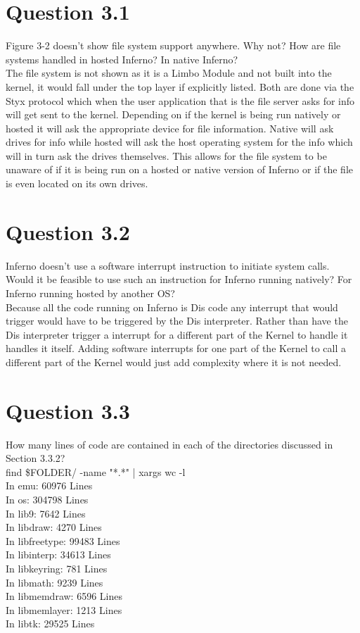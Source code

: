 \documentclass{article}
\begin{document}
\section*{Question 3.1}
Figure 3-2 doesn't show file system support anywhere.
Why not?
How are file systems handled in hosted Inferno?
In native Inferno?
\\
The file system is not shown as it is a Limbo Module and not built into the kernel, it would fall under the top layer if explicitly listed.
Both are done via the Styx protocol which when the user application that is the file server asks for info will get sent to the kernel.
Depending on if the kernel is being run natively or hosted it will ask the appropriate device for file information.
Native will ask drives for info while hosted will ask the host operating system for the info which will in turn ask the drives themselves.
This allows for the file system to be unaware of if it is being run on a hosted or native version of Inferno or if the file is even located on its own drives.

\section*{Question 3.2}
Inferno doesn't use a software interrupt instruction to initiate system calls.
Would it be feasible to use such an instruction for Inferno running natively?
For Inferno running hosted by another OS?
\\
Because all the code running on Inferno is Dis code any interrupt that would trigger would have to be triggered by the Dis interpreter.
Rather than have the Dis interpreter trigger a interrupt for a different part of the Kernel to handle it handles it itself.
Adding software interrupts for one part of the Kernel to call a different part of the Kernel would just add complexity where it is not needed.

\section*{Question 3.3}
How many lines of code are contained in each of the directories discussed in Section 3.3.2?
\\
find \$FOLDER/ -name "*.*" | xargs wc -l \\
In emu:         60976   Lines   \\
In os:          304798  Lines   \\
In lib9:        7642    Lines   \\
In libdraw:     4270    Lines   \\
In libfreetype: 99483   Lines   \\
In libinterp:   34613   Lines   \\
In libkeyring:  781     Lines   \\
In libmath:     9239    Lines   \\
In libmemdraw:  6596    Lines   \\
In libmemlayer: 1213    Lines   \\
In libtk:       29525   Lines   \\
\end{document}
